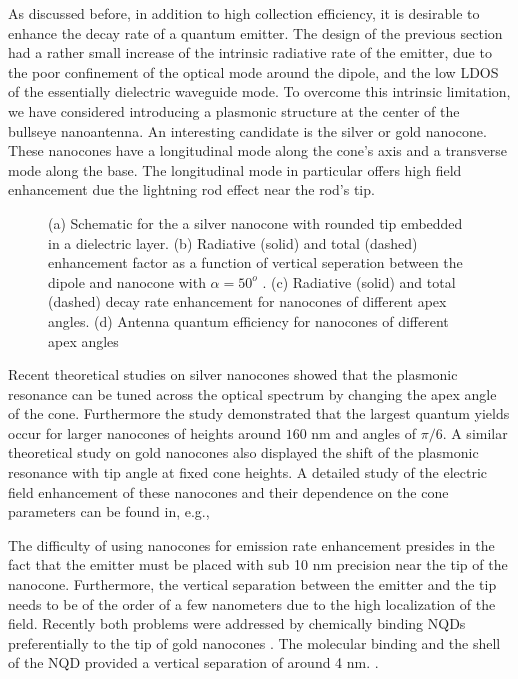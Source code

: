 \documentclass[10pt,onecolumn ]{article}
\begin{document}
As discussed before, in addition to high collection efficiency, it is desirable to enhance the decay rate of a quantum emitter. The design of the previous section had a rather small increase of the intrinsic radiative rate of the emitter, due to the poor confinement of the optical mode around the dipole, and the low LDOS of the essentially dielectric waveguide mode. 
To overcome this intrinsic limitation, we have considered introducing a plasmonic structure at the center of the bullseye nanoantenna. An interesting candidate is the silver or gold nanocone.
These nanocones have a longitudinal mode along the cone's axis and a transverse mode along the base. \cite{Meixner2015}
The longitudinal mode in particular offers high field enhancement due the lightning rod effect near the rod's tip.  \cite{Fleischer2008Three-dimensionalMicroscope}
\begin{figure}[t!]
\caption{(a) Schematic for the a silver nanocone with rounded tip embedded in a dielectric layer. (b) Radiative (solid) and total (dashed)   enhancement factor as a function of vertical seperation between the dipole and nanocone with $\alpha = 50^o$ . (c) Radiative (solid) and total (dashed) decay rate enhancement  for nanocones of different apex angles. (d) Antenna quantum efficiency for nanocones of different apex angles }
\label{fig:4}
\end{figure}
Recent theoretical studies on silver nanocones showed that the plasmonic resonance can be tuned across the optical spectrum  by changing the apex angle of the cone. \cite{DAgostino2013DipoleNanocones,Goncharenko2006ElectricMicroscopy,Goncharenko2007ElectricNano-tip}
Furthermore the study demonstrated that the largest  quantum yields occur for larger nanocones of heights around $160$ nm and angles of $\pi/6$\cite{DAgostino2013DipoleNanocones}. 
A similar theoretical study on gold nanocones also displayed the shift of the plasmonic resonance with tip angle at fixed cone heights. \cite{Mohammadi2010FluorescenceAntenna}
A detailed study of the electric field enhancement of these nanocones and their dependence on the cone parameters can be found in, e.g., \cite{Martin2001StrengthMicroscopy,GoncharenkoElectricDependence,Goncharenko2006ElectricMicroscopy,Goncharenko2007ElectricNano-tip}

The difficulty of using nanocones for emission rate enhancement presides in the fact that the emitter must be placed with sub 10 nm precision near the tip of the nanocone. 
Furthermore, the vertical separation between the emitter and the tip needs to be of the order of a few nanometers due to the high localization of the field. 
Recently both problems were addressed by chemically binding NQDs preferentially to the tip of gold nanocones .\cite{Fulmes2015Self-alignedNanostructures}
The molecular binding and the shell of the NQD provided a vertical separation of around 4 nm. \cite{Fulmes2015Self-alignedNanostructures}.
\end{document}
